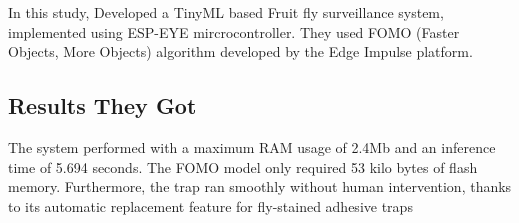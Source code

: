 \documentclass[../../main]{subfiles}
\begin{document}
In this study\cite{fruitfly}, Developed a TinyML based Fruit fly surveillance system,
implemented using ESP-EYE mircrocontroller. They used FOMO (Faster Objects,
More Objects) algorithm developed by the Edge Impulse platform.

\subsection{Results They Got}

The system performed with a maximum RAM usage of 2.4Mb and an inference time of
5.694 seconds. The FOMO model only required 53 kilo bytes of flash memory.
Furthermore, the trap ran smoothly without human intervention, thanks to its
automatic replacement feature for fly-stained adhesive traps
\end{document}
